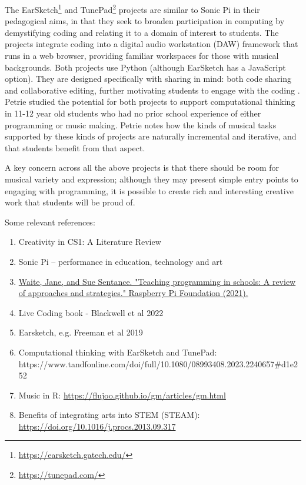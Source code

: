 The EarSketch\footnote{\url{https://earsketch.gatech.edu/}} \cite{engelman_earsketch_2017} and TunePad\footnote{\url{https://tunepad.com/}} projects are similar to Sonic Pi in their pedagogical aims, in that they seek to broaden participation in computing by demystifying coding and relating it to a domain of interest to students. The projects integrate coding into a digital audio workstation (DAW) framework that runs in a web browser, providing familiar workspaces for those with musical backgrounds. Both projects use Python (although EarSketch has a JavaScript option). They are designed specifically with sharing in mind: both code sharing and collaborative editing, further motivating students to engage with the coding \cite{freeman_earsketch_2019}. Petrie \cite{petrie_ct_2024} studied the potential for both projects to support computational thinking in 11-12 year old students who had no prior school experience of either programming or music making. Petrie notes how the kinds of musical tasks supported by these kinds of projects are naturally incremental and iterative, and that students benefit from that aspect.


A key concern across all the above projects is that there should be room for musical variety and expression; although they may present simple entry points to engaging with programming, it is possible to create rich and interesting creative work that students will be proud of.


Some relevant references:
\begin{enumerate}
\item Creativity in CS1: A Literature Review \cite{Sharmin2021}
\item Sonic Pi – performance in education, technology and art \cite{Aaron2016}
\item \href{https://www.raspberrypi.org/app/uploads/2021/11/Teaching-programming-in-schools-pedagogy-review-Raspberry-Pi-Foundation.pdf}{Waite, Jane, and Sue Sentance. "Teaching programming in schools: A review of approaches and strategies." Raspberry Pi Foundation (2021).}
\item Live Coding book - Blackwell et al 2022
\item Earsketch, e.g. Freeman et al 2019
\item Computational thinking with EarSketch and TunePad: https://www.tandfonline.com/doi/full/10.1080/08993408.2023.2240657#d1e252
\item Music in R: \href{https://flujoo.github.io/gm/articles/gm.html}{https://flujoo.github.io/gm/articles/gm.html}
\item Benefits of integrating arts into STEM (STEAM): \href{https://doi.org/10.1016/j.procs.2013.09.317}{https://doi.org/10.1016/j.procs.2013.09.317}
\end{enumerate}


